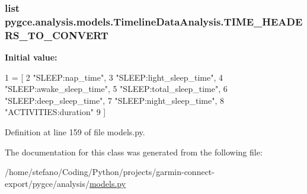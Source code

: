 \subsubsection[{\texorpdfstring{T\+I\+M\+E\+\_\+\+H\+E\+A\+D\+E\+R\+S\+\_\+\+T\+O\+\_\+\+C\+O\+N\+V\+E\+RT}{TIME_HEADERS_TO_CONVERT}}]{\setlength{\rightskip}{0pt plus 5cm}list pygce.\+analysis.\+models.\+Timeline\+Data\+Analysis.\+T\+I\+M\+E\+\_\+\+H\+E\+A\+D\+E\+R\+S\+\_\+\+T\+O\+\_\+\+C\+O\+N\+V\+E\+RT\hspace{0.3cm}{\ttfamily [static]}}\hypertarget{classpygce_1_1analysis_1_1models_1_1_timeline_data_analysis_afaebf4ce7e847ff4c32a7b9b799fd94d}{}\label{classpygce_1_1analysis_1_1models_1_1_timeline_data_analysis_afaebf4ce7e847ff4c32a7b9b799fd94d}
{\bfseries Initial value\+:}
\begin{DoxyCode}
1 = [
2         \textcolor{stringliteral}{"SLEEP:nap\_time"},
3         \textcolor{stringliteral}{"SLEEP:light\_sleep\_time"},
4         \textcolor{stringliteral}{"SLEEP:awake\_sleep\_time"},
5         \textcolor{stringliteral}{"SLEEP:total\_sleep\_time"},
6         \textcolor{stringliteral}{"SLEEP:deep\_sleep\_time"},
7         \textcolor{stringliteral}{"SLEEP:night\_sleep\_time"},
8         \textcolor{stringliteral}{"ACTIVITIES:duration"}
9     ]
\end{DoxyCode}


Definition at line 159 of file models.\+py.



The documentation for this class was generated from the following file\+:\begin{DoxyCompactItemize}
\item 
/home/stefano/\+Coding/\+Python/projects/garmin-\/connect-\/export/pygce/analysis/\hyperlink{models_8py}{models.\+py}\end{DoxyCompactItemize}
